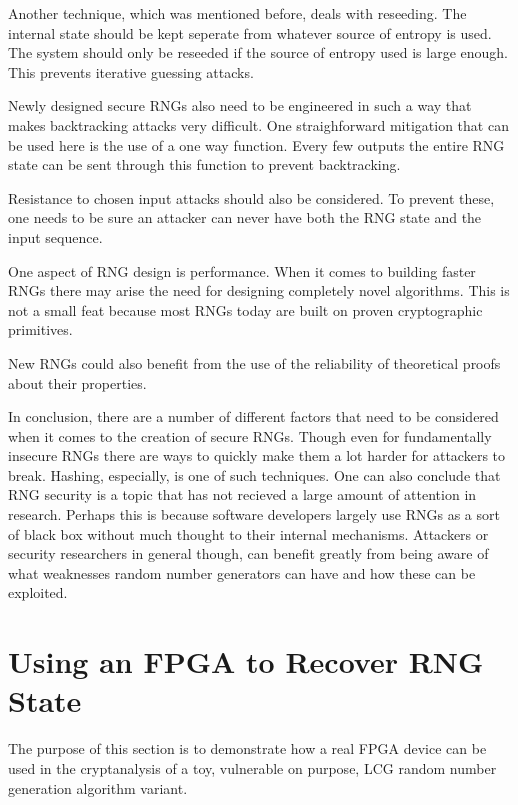 \documentclass{article}
\begin{document}
    Another technique, which was mentioned before, deals with reseeding.
    The internal state should be kept seperate from whatever source of entropy
    is used. The system should only be reseeded if the source of entropy used
    is large enough. This prevents iterative guessing attacks.

    Newly designed secure RNGs also need to be engineered in such a way that
    makes backtracking attacks very difficult.
    One straighforward mitigation that can be used here is the use of a
    one way function. Every few outputs the entire RNG state can be sent
    through this function to prevent backtracking.

    Resistance to chosen input attacks should also be considered. To prevent these,
    one needs to be sure an attacker can never have both the RNG state and the
    input sequence.

    One aspect of RNG design is performance. When it comes to building faster RNGs
    there may arise the need for designing completely novel algorithms.
    This is not a small feat because most RNGs today are built on proven cryptographic
    primitives.

    New RNGs could also benefit from the use of the reliability of theoretical proofs
    about their properties.

    In conclusion, there are a number of different factors that need to be considered
    when it comes to the creation of secure RNGs. Though even for fundamentally insecure
    RNGs there are ways to quickly make them a lot harder for attackers to break.
    Hashing, especially, is one of such techniques.
    One can also conclude that RNG security is a topic that has not recieved a large
    amount of attention in research. Perhaps this is because software developers
    largely use RNGs as a sort of black box without much thought to their internal
    mechanisms.
    Attackers or security researchers in general though, can benefit greatly from
    being aware of what weaknesses random number generators can have and
    how these can be exploited.

    \section{Using an FPGA to Recover RNG State}

    The purpose of this section is to demonstrate how a real FPGA device
    can be used in the cryptanalysis of a toy, vulnerable on purpose,
    LCG random number generation algorithm variant.
\end{document}
